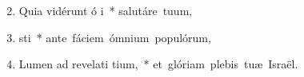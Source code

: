 \begin{flushleft}
\begin{enumerate}[leftmargin=*]
\setcounter{enumi}{1}

\item Quia vidérunt ó i~* \mbox{salutáre tuum,}

\item {} sti~* \mbox{ante fáciem ómnium populórum,}

\item Lumen ad revelati tium,~* \mbox{et glóriam plebis tuæ Israël.}


\end{enumerate}
\end{flushleft}

